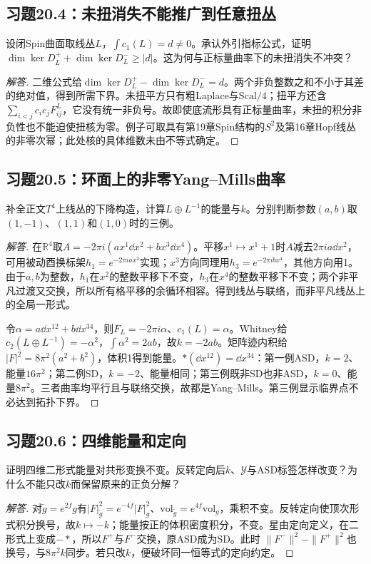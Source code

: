 \subsection*{习题20.4：未扭消失不能推广到任意扭丛}
设闭Spin曲面取线丛$L$，$\int c_1(L)=d\ne0$。承认外引指标公式，证明$\dim\ker D_L^++\dim\ker D_L^-\geq|d|$。这为何与正标量曲率下的未扭消失不冲突？
\begin{proof}[解答]
二维公式给$\dim\ker D_L^+-\dim\ker D_L^-=d$。两个非负整数之和不小于其差的绝对值，得到所需下界。未扭平方只有粗Laplace与$\mathrm{Scal}/4$；扭平方还含$\sum_{i<j}c_ic_jF^L_{ij}$，它没有统一非负号。故即使底流形具有正标量曲率，未扭的积分非负性也不能迫使扭核为零。例子可取具有第19章Spin结构的$S^2$及第16章Hopf线丛的非零次幂；此处核的具体维数未由不等式确定。
\end{proof}

\subsection*{习题20.5：环面上的非零Yang--Mills曲率}
补全正文$T^4$上线丛的下降构造，计算$L\oplus L^{-1}$的能量与$k$。分别判断参数$(a,b)$取$(1,-1)$、$(1,1)$和$(1,0)$时的三例。
\begin{proof}[解答]
在$\mathbb R^4$取$A=-2\pi i(ax^1\dd x^2+bx^3\dd x^4)$。平移$x^1\mapsto x^1+1$时$A$减去$2\pi ia\dd x^2$，可用被动酉换标架$h_1=e^{-2\pi iax^2}$实现；$x^3$方向同理用$h_3=e^{-2\pi ibx^4}$，其他方向用1。由于$a,b$为整数，$h_1$在$x^2$的整数平移下不变，$h_3$在$x^4$的整数平移下不变；两个非平凡过渡又交换，所以所有格平移的余循环相容。得到线丛与联络，而非平凡线丛上的全局一形式。

令$\alpha=a\dd x^{12}+b\dd x^{34}$，则$F_L=-2\pi i\alpha$、$c_1(L)=\alpha$。Whitney给$c_2(L\oplus L^{-1})=-\alpha^2$，$\int\alpha^2=2ab$，故$k=-2ab$。矩阵迹内积给$|F|^2=8\pi^2(a^2+b^2)$，体积1得到能量。$*(\dd x^{12})=\dd x^{34}$：第一例ASD，$k=2$、能量$16\pi^2$；第二例SD，$k=-2$、能量相同；第三例既非SD也非ASD，$k=0$、能量$8\pi^2$。三者曲率均平行且与联络交换，故都是Yang--Mills。第三例显示临界点不必达到拓扑下界。
\end{proof}

\subsection*{习题20.6：四维能量和定向}
证明四维二形式能量对共形变换不变。反转定向后$k$、$\mathcal Y$与ASD标签怎样改变？为什么不能只改$k$而保留原来的正负分解？
\begin{proof}[解答]
对$\widetilde g=e^{2f}g$有$|F|_{\widetilde g}^2=e^{-4f}|F|_g^2$、$\mathrm{vol}_{\widetilde g}=e^{4f}\mathrm{vol}_g$，乘积不变。反转定向使顶次形式积分换号，故$k\mapsto-k$；能量按正的体积密度积分，不变。星由定向定义，在二形式上变成$-* $，所以$F^+$与$F^-$交换，原ASD成为SD。此时
$\|F^-\|^2-\|F^+\|^2$也换号，与$8\pi^2k$同步。若只改$k$，便破坏同一恒等式的定向约定。
\end{proof}

